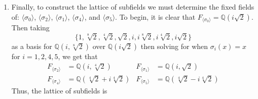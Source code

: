 \documentclass[12pt]{article}
\makeatletter
\theoremstyle{definition}
\theoremstyle{remark}
\newenvironment{solution}[1][\bf{\textit{Solution}}]{\par
  
  \normalfont \topsep6\p@\@plus6\p@\relax
  \list{}{\leftmargin=0mm
          \rightmargin=4mm
          \settowidth{\itemindent}{\itshape#1}%
          \labelwidth=\itemindent
          \parsep=0pt \listparindent=\parindent 
  }
  \item[\hskip\labelsep
        \itshape
    #1\@addpunct{.}]\ignorespaces
}{%
  \popQED\endlist\@endpefalse
}
\makeatother
\begin{document}
\begin{enumerate}[leftmargin=*]
\begin{enumerate}
\begin{solution}
\begin{center}
                            \end{center}
                        Finally, to construct the lattice of subfields we must determine the fixed fields of: $\langle\sigma_0\rangle$, $\langle\sigma_2\rangle$, $\langle\sigma_1\rangle$, $\langle\sigma_4\rangle$, and $\langle\sigma_5\rangle$. To begin, it is clear that $F_{\langle\sigma_0\rangle}=\mathbb{Q}(i\sqrt{2})$. Then taking 
                            \begin{equation*}
                                \{1,\sqrt[8]{2},\sqrt[4]{2},\sqrt{2},i,i\sqrt[8]{2},i\sqrt[4]{2},i\sqrt{2}\}
                            \end{equation*}
                        as a basis for $\mathbb{Q}(i,\sqrt[8]{2})$ over $\mathbb{Q}(i\sqrt{2})$ then solving for when $\sigma_i(x)=x$ for $i=1,2,4,5$, we get that\newpage 
                            \begin{align*}
                                F_{\langle\sigma_2\rangle}&=\mathbb{Q}(i,\sqrt[4]{2}) &  F_{\langle\sigma_1\rangle}&=\mathbb{Q}(i,\sqrt{2}) \\ F_{\langle\sigma_4\rangle}&=\mathbb{Q}(\sqrt[4]{2}+i\sqrt[4]{2}) &  F_{\langle\sigma_5\rangle}&=\mathbb{Q}(\sqrt[4]{2}-i\sqrt[4]{2}) 
                            \end{align*}
                         Thus, the lattice of subfields is
                            \begin{center}
\end{center}
\end{solution}
\end{enumerate}
\end{enumerate}
\end{document}
